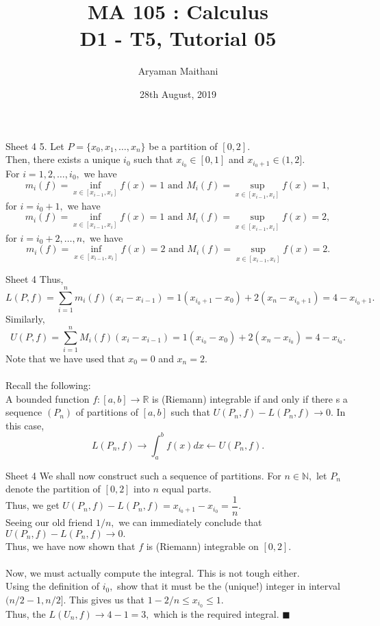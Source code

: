 \documentclass[handout, aspectratio=169]{beamer}
\title{MA 105 : Calculus\\ D1 - T5, Tutorial 05}  %
\author{Aryaman Maithani}
\date[28-08-2019]{28th August, 2019}               %
\institute[IITB]{IIT Bombay}
\begin{document}
\begin{frame}
	\titlepage
\end{frame}
\begin{frame}{Sheet 4}                            %
	5. Let $P = \{x_0, x_1, \ldots, x_n\}$ be a partition of $[0, 2].$\\
	Then, there exists a unique $i_0$ such that $x_{i_0} \in [0, 1]$ and $x_{i_0 + 1} \in (1, 2].$\\
	For $i = 1, 2, \ldots, i_0,$ we have
	\[m_i(f) = \inf_{x \in [x_{i-1}, x_i]} f(x) = 1 \text{ and } M_i(f) = \sup_{x \in [x_{i-1}, x_i]}f(x) = 1,\]
	for $i = i_0 + 1,$ we have
	\[m_i(f) = \inf_{x \in [x_{i-1}, x_i]} f(x) = 1 \text{ and } M_i(f) = \sup_{x \in [x_{i-1}, x_i]}f(x) = 2,\]
	for $i = i_0 + 2, \ldots, n,$ we have
	\[m_i(f) = \inf_{x \in [x_{i-1}, x_i]} f(x) = 2 \text{ and } M_i(f) = \sup_{x \in [x_{i-1}, x_i]}f(x) = 2.\]
\end{frame}
\begin{frame}{Sheet 4}
	Thus,
	\[L(P, f) = \sum_{i=1}^{n}m_i(f)(x_i - x_{i-1}) = 1(x_{i_0 + 1} - x_0) + 2(x_n - x_{i_0 + 1}) = 4 - x_{i_0 + 1}.\]
	Similarly,
	\[U(P, f) = \sum_{i=1}^{n}M_i(f)(x_i - x_{i-1}) = 1(x_{i_0} - x_0) + 2(x_n - x_{i_0}) = 4 - x_{i_0}.\]
	Note that we have used that $x_0 = 0$ and $x_n = 2.$\\~\\
	Recall the following:\\
	A bounded function $f:[a, b] \to \mathbb{R}$ is (Riemann) integrable if and only if there s a sequence $(P_n)$ of partitions of $[a, b]$ such that $U(P_n, f) - L(P_n, f) \to 0.$ In this case,
	\[L(P_n, f) \to \int_{a}^{b} f(x) dx \leftarrow U(P_n, f).\]
	
\end{frame}
\begin{frame}{Sheet 4}
	We shall now construct such a sequence of partitions. For $n \in \mathbb{N},$ let $P_n$ denote the partition of $[0, 2]$ into $n$ equal parts.\\
	Thus, we get $U(P_n, f) - L(P_n, f) = x_{i_0 + 1} - x_{i_0} = \dfrac{1}{n}.$\\
	Seeing our old friend $1/n,$ we can immediately conclude that $U(P_n, f) - L(P_n, f) \to 0.$\\
	Thus, we have now shown that $f$ is (Riemann) integrable on $[0, 2].$\\~\\
	Now, we must actually compute the integral. This is not tough either.\\
	Using the definition of $i_0,$ show that it must be the (unique!) integer in interval $(n/2 - 1, n/2].$ This gives us that $1 - 2/n \le x_{i_0} \le 1.$\\
	Thus, the $L(U_n, f) \to 4-1 = 3,$ which is the required integral. \hfill $\blacksquare$
\end{frame}
\end{document}
